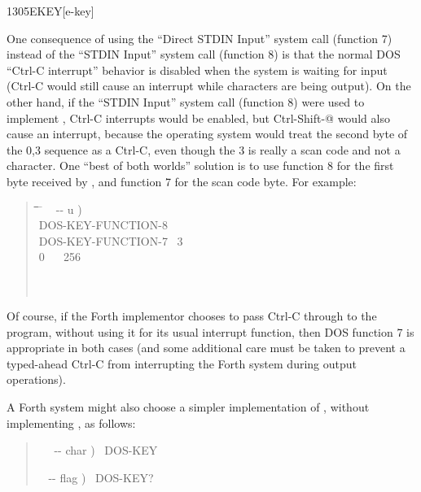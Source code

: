 \begin{worddef}{1305}{EKEY}[e-key]
\begin{defer}
		One consequence of using the ``Direct STDIN Input'' system call
		(function 7) instead of the ``STDIN Input'' system call
		(function 8) is that the normal DOS ``Ctrl-C interrupt'' behavior
		is disabled when the system is waiting for input (Ctrl-C would
		still cause an interrupt while characters are being output). On
		the other hand, if the ``STDIN Input'' system call (function 8)
		were used to implement , Ctrl-C interrupts would be
		enabled, but Ctrl-Shift-@ would also cause an interrupt, because
		the operating system would treat the second byte of the 0,3
		sequence as a Ctrl-C, even though the 3 is really a scan code
		and not a character. One ``best of both worlds'' solution is to
		use function 8 for the first byte received by , and
		function 7 for the scan code byte. For example:

		\begin{quote}
			\ttfamily
			\begin{tabbing}
			\tab \= \tab \= \tab \= \tab \= \hspace{7em} \= \kill
			\+ \word{:} ~  -{}- u ) \\
				\+ DOS-KEY-FUNCTION-8~ ~ ~  \\
					DOS-KEY-FUNCTION-7~  3~ \word{=}~  \\
					\>  0~ ~ 256 \word{+}\\
				\- \word{THEN} \\
			\-  \\
			\word{;}
			\end{tabbing}
		\end{quote}

		Of course, if the Forth implementor chooses to pass Ctrl-C
		through to the program, without using it for its usual
		interrupt function, then DOS function 7 is appropriate in both
		cases (and some additional care must be taken to prevent a
		typed-ahead Ctrl-C from interrupting the Forth system during
		output operations).

		A Forth system might also choose a simpler implementation of
		, without implementing , as follows:

		\begin{quote}\ttfamily
			\word{:} ~~  -{}- char )~
				DOS-KEY~
			\word{;}

			\word{:} ~  -{}- flag )~
				DOS-KEY?~ ~
			\word{;}
		\end{quote}


\end{defer}
\end{worddef}
